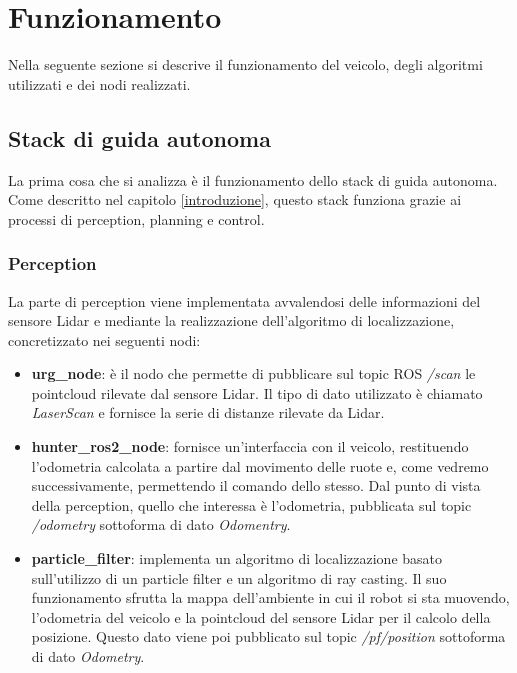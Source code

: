\section{Funzionamento}
Nella seguente sezione si descrive il funzionamento del veicolo, degli algoritmi utilizzati e dei nodi realizzati.

\subsection{Stack di guida autonoma}
La prima cosa che si analizza è il funzionamento dello stack di guida autonoma. Come descritto nel capitolo \ref{introduzione}, questo stack funziona grazie ai processi di perception, planning e control. 

\subsubsection{Perception} \label{funzionamento_autonomo_perception}
La parte di perception viene implementata avvalendosi delle informazioni del sensore Lidar e mediante la realizzazione dell'algoritmo di localizzazione, concretizzato nei seguenti nodi:
\begin{itemize}
  \item \textbf{urg\_node}: è il nodo che permette di pubblicare sul topic ROS \textit{/scan} le pointcloud rilevate dal sensore Lidar. Il tipo di dato utilizzato è chiamato \textit{LaserScan} e fornisce la serie di distanze rilevate da Lidar.
  
  \item \textbf{hunter\_ros2\_node}: fornisce un'interfaccia con il veicolo, restituendo l'odometria calcolata a partire dal movimento delle ruote e, come vedremo successivamente, permettendo il comando dello stesso. Dal punto di vista della perception, quello che interessa è l'odometria, pubblicata sul topic \textit{/odometry} sottoforma di dato \textit{Odomentry}. 
  
  \item \textbf{particle\_filter}: implementa un algoritmo di localizzazione basato sull'utilizzo di un particle filter e un algoritmo di ray casting. Il suo funzionamento sfrutta la mappa dell'ambiente in cui il robot si sta muovendo, l'odometria del veicolo e la pointcloud del sensore Lidar per il calcolo della posizione. Questo dato viene poi pubblicato sul topic \textit{/pf/position} sottoforma di dato \textit{Odometry}.
\end{itemize}


